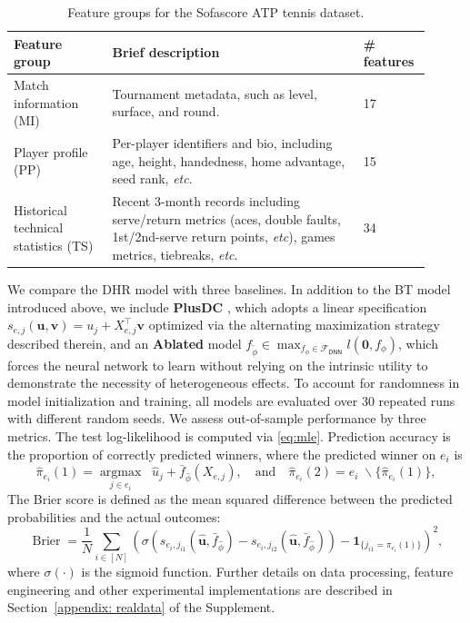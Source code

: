 \documentclass[
  12pt]{article}
\def\1{\bm{1}}
\begin{document}
\begin{table}[!ht]
\centering

\caption{Feature groups for the Sofascore ATP tennis dataset.}
\begin{tabular}{ 
    >{\raggedright\arraybackslash}m{0.22\linewidth} 
    >{\raggedright\arraybackslash}m{0.57\linewidth} 
    m{0.12\linewidth} 
}
\toprule
Feature group & Brief description & \# features \\
\midrule

Match information (MI) & 
Tournament metadata, such as level, surface, and round. & 
\hfill 17 \\
\addlinespace 

Player profile (PP) & 
Per-player identifiers and bio, including age, height, handedness, home advantage, seed rank, \textit{etc}. & 
\hfill 15 \\
\addlinespace

Historical technical statistics (TS) & 
Recent 3-month records including serve/return metrics (aces, double faults, 1st/2nd-serve return points, \textit{etc}), games metrics, tiebreaks, \textit{etc}. & 
\hfill 34 \\
\bottomrule
\end{tabular}
\label{tab:feature_groups}
\end{table}
We compare the DHR model with three baselines. In addition to the BT model introduced above, we include \textbf{PlusDC} 
\citep{dong2025statistical}, which adopts a linear specification $s_{e,j}(\boldsymbol{u}, \boldsymbol{v})=u_j+X_{e,j}^\top 
\boldsymbol{v}$ optimized via the alternating maximization strategy described therein, and an \textbf{Ablated} model $f_{\widetilde{\phi}} \in \max_{f_\phi \in \mathcal{F}_{\mathsf{DNN}}} l(\boldsymbol{0}, f_{\phi})$, which forces the neural network to learn without relying on the intrinsic utility to demonstrate the necessity of heterogeneous effects. To account for randomness in model initialization and training, all models are evaluated over 30 repeated runs with different random seeds. We assess out-of-sample performance by three metrics. The test log-likelihood is computed via \eqref{eq:mle}. Prediction accuracy is the proportion of correctly predicted winners, where the predicted winner on $e_i$ is $$\widehat{\pi}_{e_i}(1)= \underset{j\in e_i}{\operatorname{argmax}} \;\;\widehat{u}_j+\bar{f}_{\widehat{\phi}}(X_{e, j}), \quad \text{and} \quad \widehat{\pi}_{e_i}(2)= e_i \; \backslash \{\widehat{\pi}_{e_i}(1)\},$$ The Brier score is defined as the mean squared difference between the predicted probabilities and the actual outcomes: $$\operatorname{Brier} = \frac{1}{N}\sum_{i \in [N]} \left(\sigma(s_{e_i,j_{i1}}(\widehat{\boldsymbol{u}}, \bar{f}_{\widehat{\phi}})-s_{e_i,j_{i2}}(\widehat{\boldsymbol{u}}, \bar{f}_{\widehat{\phi}})) - \1_{\displaystyle\{ j_{i1}=\pi_{e_i}(1)\}} \right)^2,$$ where $\sigma(\cdot)$ is the sigmoid function. Further details on data processing, feature engineering and other experimental implementations are described in Section~\ref{appendix: realdata} of the Supplement.
\end{document}

